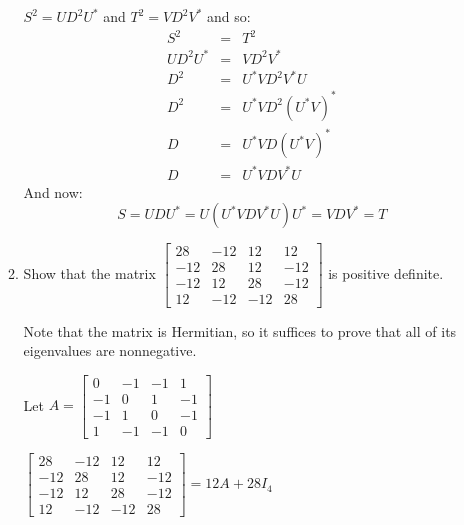 \documentclass[letterpaper,12pt,fleqn]{article}
\begin{document}
\begin{enumerate}
\begin{enumerate}
    $S^2=UD^2U^*$ and $T^2=VD^2V^*$ and so:
    \begin{eqnarray*}
      S^2 &=& T^2 \\
      UD^2U^* &=& VD^2V^* \\
      D^2 &=& U^*VD^2V^*U \\
      D^2 &=& U^*VD^2(U^*V)^* \\
      D &=& U^*VD(U^*V)^* \\
      D &=& U^*VDV^*U
    \end{eqnarray*}
    And now:
    \[S=UDU^*=U(U^*VDV^*U)U^*=VDV^*=T\]

    \newcommand{\mb}{\begin{bmatrix}
        28 & -12 & 12 & 12 \\
        -12 & 28 & 12 & -12 \\
        -12 & 12 & 28 & -12 \\
        12 & -12 & -12 & 28
    \end{bmatrix}}
    
  \item Show that the matrix $\mb$ is positive definite.

    Note that the matrix is Hermitian, so it suffices to prove that all of its
    eigenvalues are nonnegative.
    
    Let $A=\begin{bmatrix}
    0 & -1 & -1 & 1 \\
    -1 & 0 & 1 & -1 \\
    -1 & 1 & 0 & -1 \\
    1 & -1 & -1 & 0
    \end{bmatrix}$
    
    $\mb=12A+28I_4$


\end{enumerate}
\end{enumerate}
\end{document}
